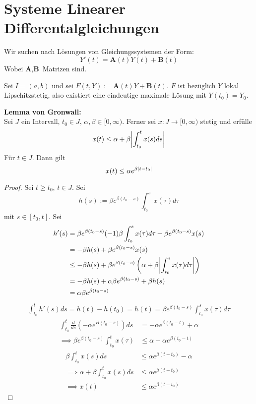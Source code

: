 \documentclass{report}
\newcommand*{\newpar}{\par\vspace{\baselineskip}\noindent}
\newcommand{\tbf}[1]{\textbf{#1}}
\newcommand{\tbA}{\mathbf{A}}
\newcommand{\tbB}{\mathbf{B}}
\begin{document}
\chapter{Systeme Linearer Differentalgleichungen}
Wir suchen nach Lösungen von Gleichungssystemen der Form:
\[Y'(t) = \tbf{A}(t) Y(t) + \tbf{B}(t)\]
Wobei $\tbf{A}, \tbf{B}$ Matrizen sind.
\newpar
Sei $I = (a,b)$ und sei $F(t,Y) := \tbA(t) Y + \tbB(t)$. $F$ ist bezüglich $Y$ lokal Lipschitzstetig, also existiert eine eindeutige maximale Lösung mit $Y(t_0) = Y_0$.
\begin{lemma}
	\tbf{Lemma von Gronwall:}\\
	Sei $J$ ein Intervall, $t_0 \in J$, $\alpha, \beta \in [0, \infty)$. Ferner sei $x : J \to [0, \infty)$ stetig und erfülle
	\[x(t) \leq \alpha + \beta \abs{\int_{t_0}^t x(s) ds}\]
	Für $t \in J$. Dann gilt
	\[x(t) \leq \alpha e^{\beta \abs{t - t_0}}\]
\end{lemma}
\begin{proof}
	Sei $t \geq t_0$, $t \in J$. Sei
	\[h(s) := \beta e^{\beta(t_0 - s)}\int_{t_0}^s x(\tau) d\tau\]
	mit $s \in [t_0, t]$. Sei
	\begin{align*}
		h'(s) &= \beta e^{\beta(t_0 - s)} (-1)\beta \int_{t_0}^s x(\tau) d\tau + \beta e^{\beta(t_0 - s)} x(s)\\
			  &= - \beta h(s) + \beta e^{\beta(t_0 - s)} x(s)\\
			  &\leq - \beta h(s) + \beta e^{\beta(t_0 - s)} \left(\alpha + \beta \abs{\int_{t_0}^s x(\tau) d\tau}\right)\\
			  &= - \beta h(s) + \alpha \beta e^{\beta(t_0 - s)} + \beta h(s)\\
			  &= \alpha \beta e^{\beta(t_0 - s)}
	\end{align*}
	\begin{align*}
		\int_{t_0}^t h'(s) ds = h(t) - h(t_0) = h(t) = \beta e^{\beta(t_0 - s)}\int_{t_0}^s x(\tau) d\tau
	\end{align*}
	\begin{align*}
		\int_{t_0}^t \frac{d}{ds}(-\alpha e^{B(t_0 - s)}) ds &= -\alpha e^{\beta(t_0 - t)} + \alpha\\
		\implies \beta e^{\beta(t_0 - s)}\int_{t_0}^t x(\tau) &\leq \alpha -\alpha e^{\beta(t_0 - t)}
	\end{align*}
	\begin{align*}
		\beta \int_{t_0}^t x(s) ds &\leq \alpha e^{\beta(t - t_0)} - \alpha\\
		\implies \alpha + \beta \int_{t_0}^t x(s) ds &\leq \alpha e^{\beta(t - t_0)}\\
		\implies x(t) &\leq \alpha e^{\beta(t - t_0)}
	\end{align*}
\end{proof}
\end{document}
